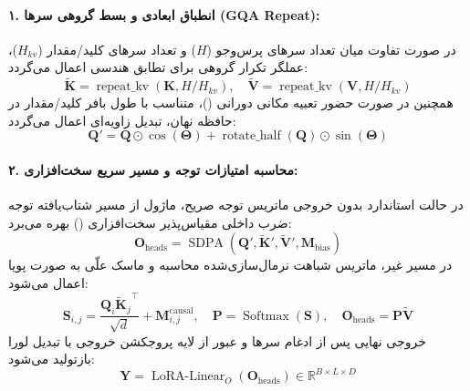 \paragraph{۱. انطباق ابعادی و بسط گروهی سرها (GQA Repeat):}
در صورت تفاوت میان تعداد سرهای پرس‌وجو ($H$) و تعداد سرهای کلید/مقدار ($H_{kv}$)، عملگر تکرار گروهی برای تطابق هندسی اعمال می‌گردد:
\begin{equation}
\tilde{\mathbf{K}} = \operatorname{repeat\_kv}(\mathbf{K}, H / H_{kv}), \quad \tilde{\mathbf{V}} = \operatorname{repeat\_kv}(\mathbf{V}, H / H_{kv})
\end{equation}
همچنین در صورت حضور تعبیه مکانی دورانی ()، متناسب با طول بافر کلید/مقدار در حافظه نهان، تبدیل زاویه‌ای اعمال می‌گردد:
\begin{equation}
\mathbf{Q}' = \mathbf{Q} \odot \cos(\mathbf{\Theta}) + \operatorname{rotate\_half}(\mathbf{Q}) \odot \sin(\mathbf{\Theta})
\end{equation}

\paragraph{۲. محاسبه امتیازات توجه و مسیر سریع سخت‌افزاری:}
در حالت استاندارد بدون خروجی ماتریس توجه صریح، ماژول از مسیر شتاب‌یافته توجه ضرب داخلی مقیاس‌پذیر سخت‌افزاری () بهره می‌برد:
\begin{equation}
\mathbf{O}_{\text{heads}} = \operatorname{SDPA}\left(\mathbf{Q}', \tilde{\mathbf{K}}', \tilde{\mathbf{V}}', \mathbf{M}_{\text{bias}}\right)
\end{equation}
در مسیر غیر‌، ماتریس شباهت نرمال‌سازی‌شده محاسبه و ماسک علّی به صورت پویا اعمال می‌شود:
\begin{equation}
\mathbf{S}_{i, j} = \frac{\mathbf{Q}_i {\tilde{\mathbf{K}}_j}^\top}{\sqrt{d}} + \mathbf{M}_{i, j}^{\text{causal}}, \quad \mathbf{P} = \operatorname{Softmax}(\mathbf{S}), \quad \mathbf{O}_{\text{heads}} = \mathbf{P} \tilde{\mathbf{V}}
\end{equation}
خروجی نهایی پس از ادغام سرها و عبور از لایه پروجکشن خروجی با تبدیل لورا بازتولید می‌شود:
\begin{equation}
\mathbf{Y} = \operatorname{LoRA-Linear}_O(\mathbf{O}_{\text{heads}}) \in \mathbb{R}^{B \times L \times D}
\end{equation}

